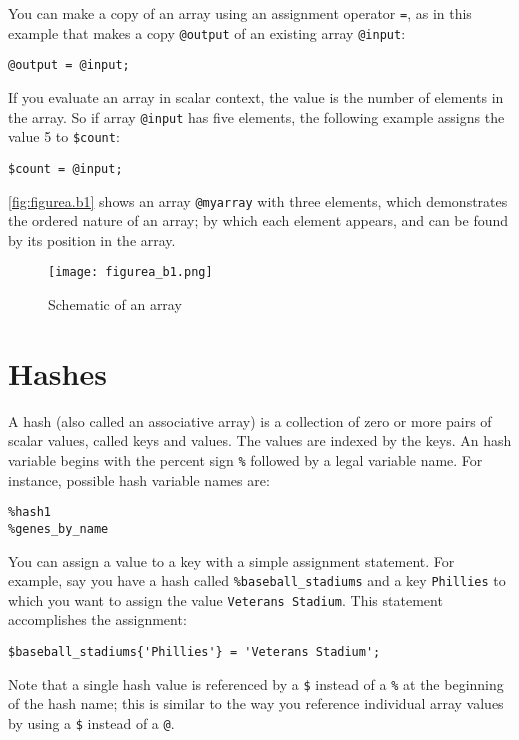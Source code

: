 You can make a copy of an array using an assignment operator \verb|=|, as in this example that makes a copy \verb|@output| of an existing array \verb|@input|: 

\begin{lstlisting}
@output = @input;
\end{lstlisting}

If you evaluate an array in scalar context, the value is the number of elements in the array. So if array \verb|@input| has five elements, the following example assigns the value 5 to \verb|$count|:

\begin{lstlisting}
$count = @input;
\end{lstlisting}

\autoref{fig:figurea.b1} shows an array \verb|@myarray| with three elements, which demonstrates the ordered nature of an array; by which each element appears, and can be found by its position in the array.

\begin{figure}
  \centering
  \texttt{[image: figurea\_b1.png]}
  \caption{Schematic of an array}
  \label{fig:figurea.b1}
 \end{figure}{}

\section{Hashes}
A hash (also called an associative array) is a collection of zero or more pairs of scalar values, called keys and values. The values are indexed by the keys. An hash variable begins with the percent sign \verb|%| followed by a legal variable name. For instance, possible hash variable names are:

\begin{lstlisting}
%hash1
%genes_by_name
\end{lstlisting}

You can assign a value to a key with a simple assignment statement. For example, say you have a hash called \verb|%baseball_stadiums| and a key \verb|Phillies| to which you want to assign the value \verb|Veterans Stadium|. This statement accomplishes the assignment:

\begin{lstlisting}
$baseball_stadiums{'Phillies'} = 'Veterans Stadium';
\end{lstlisting}

Note that a single hash value is referenced by a \verb|$| instead of a \verb|%| at the beginning of the hash name; this is similar to the way you reference individual array values by using a \verb|$| instead of a \verb|@|.

